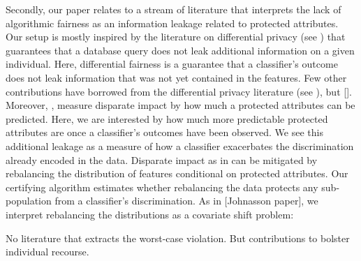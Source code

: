 \documentclass{article}
\begin{document}
 \bigskip
 Secondly, our paper relates to a stream of literature that interprets the lack of algorithmic fairness as an information leakage related to protected attributes. Our setup is mostly inspired by the literature on differential privacy (see \cite{dwork2014algorithmic}) that guarantees that a database query does not leak additional information on a given individual. Here, differential fairness is a guarantee that a classifier's outcome does not leak information that was not yet contained in the features. Few other contributions have borrowed from the differential privacy literature (see ), but []. Moreover, \cite{feldman2015certifying}, \cite{Loubes2018} measure disparate impact by how much a protected attributes can be predicted. Here, we are interested by how much more predictable protected attributes are once a classifier's outcomes have been observed. We see this additional leakage as a measure of how a classifier exacerbates the  discrimination already encoded in the data. Disparate impact as in  \cite{feldman2015certifying} can be mitigated by rebalancing the distribution of features conditional on protected attributes. Our certifying algorithm estimates whether rebalancing the data protects any sub-population from a classifier's discrimination. As in [Johnasson paper], we interpret rebalancing the distributions as a covariate shift problem: 
 
 \bigskip
 No literature that extracts the worst-case violation. But contributions to bolster individual recourse. 
 
 \bigskip
 
 
\end{document}
